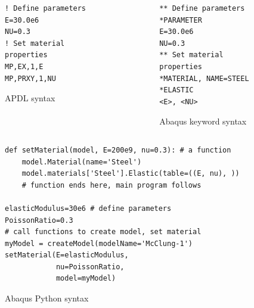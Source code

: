 \begin{frame}[fragile]
\begin{columns}
\begin{column}{0.45\textwidth}
\begin{figure}[bp]
\begin{lstlisting}[language={APDL}]
! Define parameters
E=30.0e6
NU=0.3
! Set material properties
MP,EX,1,E
MP,PRXY,1,NU
\end{lstlisting}
\caption{APDL syntax \label{fig:material-apdl}}
\end{figure}
\end{column}
\begin{column}{0.45\textwidth}
\begin{figure}[bp]
\begin{lstlisting}[language={Abaqus}]
** Define parameters
*PARAMETER
E=30.0e6
NU=0.3
** Set material properties
*MATERIAL, NAME=STEEL
*ELASTIC
<E>, <NU>
\end{lstlisting}
\caption{Abaqus keyword syntax \label{fig:material-abaqus-keyword}}
\end{figure}
\end{column}
\end{columns}
\end{frame}

\begin{frame}[fragile]
\begin{figure}[bp]
\begin{lstlisting}
def setMaterial(model, E=200e9, nu=0.3): # a function
    model.Material(name='Steel')
    model.materials['Steel'].Elastic(table=((E, nu), ))
    # function ends here, main program follows

elasticModulus=30e6 # define parameters
PoissonRatio=0.3
# call functions to create model, set material
myModel = createModel(modelName='McClung-1')
setMaterial(E=elasticModulus,
            nu=PoissonRatio,
            model=myModel)
\end{lstlisting}
\caption{Abaqus Python syntax}
\end{figure}
\end{frame}

